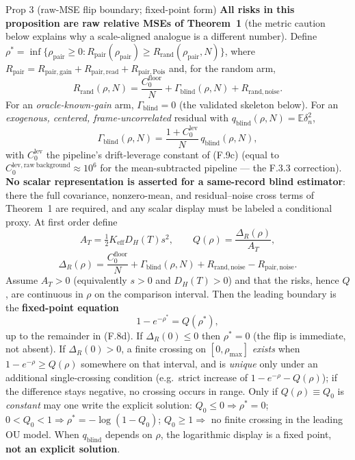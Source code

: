 \begin{namedthm}{Prop 3 (raw-MSE flip boundary; fixed-point form)}
\textbf{All risks in this proposition are raw relative MSEs of Theorem~1} (the metric caution below explains why a scale-aligned analogue is a different number). Define $\rho^*=\inf\{\rho_{\mathrm{pair}}\ge0: R_{\mathrm{pair}}(\rho_{\mathrm{pair}})\ge R_{\mathrm{rand}}(\rho_{\mathrm{pair}},N)\}$, where $R_{\mathrm{pair}}=R_{\mathrm{pair,gain}}+R_{\mathrm{pair,read}}+R_{\mathrm{pair,Pois}}$ and, for the random arm,
\begin{equation}
R_{\mathrm{rand}}(\rho,N)
=\frac{C_0^{\mathrm{floor}}}{N}
+\Gamma_{\mathrm{blind}}(\rho,N)
+R_{\mathrm{rand,noise}} . \tag{F.12a}
\end{equation}
For an \emph{oracle-known-gain} arm, $\Gamma_{\mathrm{blind}}=0$ (the validated skeleton below). For an \emph{exogenous, centered, frame-uncorrelated} residual with $q_{\mathrm{blind}}(\rho,N)=\mathbb{E}\delta_n^2$,
\begin{equation}
\Gamma_{\mathrm{blind}}(\rho,N)
=\frac{1+C_0^{\mathrm{lev}}}{N}\,q_{\mathrm{blind}}(\rho,N),
\tag{F.12b}
\end{equation}
with $C_0^{\mathrm{lev}}$ the pipeline's drift-leverage constant of (F.9c) (equal to $C_0^{\mathrm{lev,raw\ background}}\approx10^6$ for the mean-subtracted pipeline --- the F.3.3 correction). \textbf{No scalar representation is asserted for a same-record blind estimator}: there the full covariance, nonzero-mean, and residual--noise cross terms of Theorem~1 are required, and any scalar display must be labeled a conditional proxy. At first order define
\[
A_T=\tfrac12K_{\mathrm{eff}}D_H(T)s^2,
\qquad
Q(\rho)=\frac{\Delta_R(\rho)}{A_T},
\]
\[
\Delta_R(\rho)=\frac{C_0^{\mathrm{floor}}}{N}+\Gamma_{\mathrm{blind}}(\rho,N)
+R_{\mathrm{rand,noise}}-R_{\mathrm{pair,noise}} .
\]
Assume $A_T>0$ (equivalently $s>0$ and $D_H(T)>0$) and that the risks, hence $Q$, are continuous in $\rho$ on the comparison interval. Then the leading boundary is the \textbf{fixed-point equation}
\begin{equation}
1-e^{-\rho^*}=Q(\rho^*), \tag{F.12}
\end{equation}
up to the remainder in (F.8d). If $\Delta_R(0)\le0$ then $\rho^*=0$ (the flip is immediate, not absent). If $\Delta_R(0)>0$, a finite crossing on $[0,\rho_{\max}]$ \emph{exists} when $1-e^{-\rho}\ge Q(\rho)$ somewhere on that interval, and is \emph{unique} only under an additional single-crossing condition (e.g.\ strict increase of $1-e^{-\rho}-Q(\rho)$); if the difference stays negative, no crossing occurs in range. Only if $Q(\rho)\equiv Q_0$ is \emph{constant} may one write the explicit solution: $Q_0\le0\Rightarrow\rho^*=0$; $0<Q_0<1\Rightarrow\rho^*=-\log(1-Q_0)$; $Q_0\ge1\Rightarrow$ no finite crossing in the leading OU model. When $q_{\mathrm{blind}}$ depends on $\rho$, the logarithmic display is a fixed point, \textbf{not an explicit solution}.
\end{namedthm}

